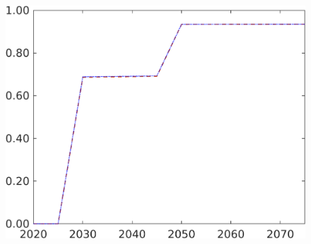 \begin{figure}[h!!]
\begin{minipage}[]{0.32\textwidth}
	\end{minipage}
	\begin{minipage}[]{0.32\textwidth}
		\includegraphics[width=1\textwidth]{../../codding_model/own_basedOnFried/optimalPol_190722_tidiedUp/figures/all_July22/tauf_DDCompEffOPT_T_NoTaus_pol4_spillover0_noskill0_sep1_xgrowth0_etaa0.79_lgd0_lff0.png}
	\end{minipage}
\end{figure}

